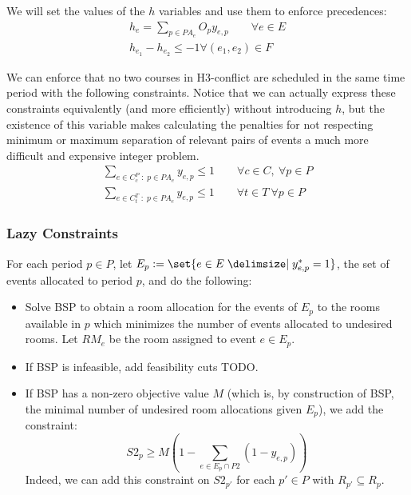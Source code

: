 \documentclass{article}
\theoremstyle{plain}
\numberwithin{theorem}{section}
\numberwithin{example}{section}
\theoremstyle{definition}
\begin{document}
We will set the values of the $h$ variables and use them to enforce precedences:
\begin{gather}
    h_e = \sum_{p \in PA_e} O_p y_{e, p} \qquad \forall e \in E \\
    h_{e_1} - h_{e_2} \leq -1 \forall (e_1, e_2) \in F
\end{gather}

We can enforce that no two courses in H3-conflict are scheduled in the same time
period with the following constraints. Notice that we can actually express these
constraints equivalently (and more efficiently) without introducing $h$, but the
existence of this variable makes calculating the penalties for not respecting
minimum or maximum separation of relevant pairs of events a much more difficult
and expensive integer problem.
\begin{gather}
    \sum_{e \in C^P_c \; : \; p \in PA_e} y_{e,p} \leq 1
        \qquad \forall c \in C, \ \forall p \in P \\
    \sum_{e \in C^T_t \; : \; p \in PA_e} y_{e, p} \leq 1
        \qquad \forall t \in T \ \forall p \in P
\end{gather}

\subsubsection*{Lazy Constraints}
For each period $p \in P$, let $E_p := \set{e \in E \given y^*_{e, p} = 1}$, the
set of events allocated to period $p$, and do the following:
\begin{itemize}
    \item Solve BSP to obtain a room allocation for the events of $E_p$ to the
        rooms available in $p$ which minimizes the number of events allocated to
        undesired rooms. Let $RM_e$ be the room assigned to event $e \in E_p$.
    \item If BSP is infeasible, add feasibility cuts TODO.
    \item If BSP has a non-zero objective value $M$ (which is, by construction
        of BSP, the minimal number of undesired room allocations given $E_p$),
        we add the constraint:
        \begin{equation}
            S2_p \geq M \left(1 - \sum_{e \in E_p \cap P2} (1 - y_{e, p})\right)
        \end{equation}
        Indeed, we can add this constraint on $S2_{p'}$ for each $p' \in P$ with
        $R_{p'} \subseteq R_p$.
\end{itemize}
\end{document}
